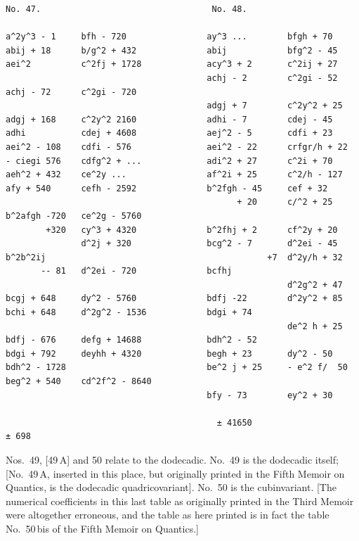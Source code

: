 \documentclass[11pt]{article}
\begin{document}
\begin{small}
\begin{verbatim}
No. 47.                                  No. 48.

a^2y^3 - 1     bfh - 720                ay^3 ...        bfgh + 70
abij + 18      b/g^2 + 432              abij            bfg^2 - 45
aei^2          c^2fj + 1728             acy^3 + 2       c^2ij + 27
                                        achj - 2        c^2gi - 52
achj - 72      c^2gi - 720
                                        adgj + 7        c^2y^2 + 25
adgj + 168     c^2y^2 2160              adhi - 7        cdej - 45
adhi           cdej + 4608              aej^2 - 5       cdfi + 23
aei^2 - 108    cdfi - 576               aei^2 - 22      crfgr/h + 22
- ciegi 576    cdfg^2 + ...             adi^2 + 27      c^2i + 70
aeh^2 + 432    ce^2y ...                af^2i + 25      c^2/h - 127
afy + 540      cefh - 2592              b^2fgh - 45     cef + 32
                                              + 20      c/^2 + 25
b^2afgh -720   ce^2g - 5760
        +320   cy^3 + 4320              b^2fhj + 2      cf^2y + 20
               d^2j + 320               bcg^2 - 7       d^2ei - 45
b^2b^2ij                                            +7  d^2y/h + 32
       -- 81   d^2ei - 720              bcfhj
                                                        d^2g^2 + 47
bcgj + 648     dy^2 - 5760              bdfj -22        d^2y^2 + 85
bchi + 648     d^2g^2 - 1536            bdgi + 74
                                                        de^2 h + 25
bdfj - 676     defg + 14688             bdh^2 - 52
bdgi + 792     deyhh + 4320             begh + 23       dy^2 - 50
bdh^2 - 1728                            be^2 j + 25     - e^2 f/  50
beg^2 + 540    cd^2f^2 - 8640
                                        bfy - 73        ey^2 + 30

                                          ± 41650                                              ± 698
\end{verbatim}
\end{small}

\bigskip

Nos.\ 49, [49\,A] and 50 relate to the dodecadic. No.\ 49 is the dodecadic itself; [No.\ 49\,A, inserted in this place, but originally printed in the Fifth Memoir on Quantics, is the dodecadic quadricovariant]. No.\ 50 is the cubinvariant. [The numerical coefficients in this last table as originally printed in the Third Memoir were altogether erroneous, and the table as here printed is in fact the table No.\ 50\,bis of the Fifth Memoir on Quantics.]
\end{document}
